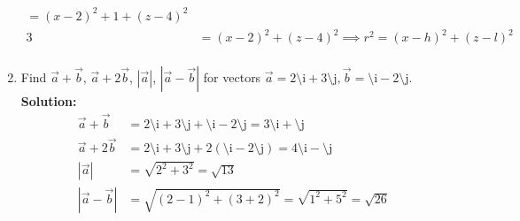 \documentclass{article}[A4, 12pt]
\newcommand{\vi}{\text{\^\i}}
\newcommand{\vj}{\text{\^\j}}
\begin{document}
\begin{enumerate}
\begin{align*}
						= (x - 2)^2 + 1 + (z - 4)^2  \tag{$xz$} \\
					3 &= (x - 2)^2 + (z - 4)^2 
						\implies r^2 = (x - h)^2 + (z - l)^2 \\
			\end{align*}
		\item
			Find $\vec{a} + \vec{b}$, $\vec{a} + 2\vec{b}$, $|\vec{a}|$, $|\vec{a} - \vec{b}|$ for vectors $\vec{a} = 2\vi + 3\vj, \vec{b} = \vi - 2\vj$. \\
			\textbf{Solution:}
			\begin{align*}
				\vec{a} + \vec{b} &= 2\vi + 3\vj + \vi - 2\vj = 3\vi + \vj \\
				\vec{a} + 2\vec{b} &= 2\vi + 3\vj + 2(\vi - 2\vj) = 4\vi -\vj \\
				|\vec{a}| &= \sqrt{2^2 + 3^2} = \sqrt{13} \\
				|\vec{a} - \vec{b}| &= \sqrt{(2 - 1)^2 + (3 + 2)^2} = \sqrt{1^2 + 5^2} = \sqrt{26}
			\end{align*}
	\end{enumerate}
\end{document}
